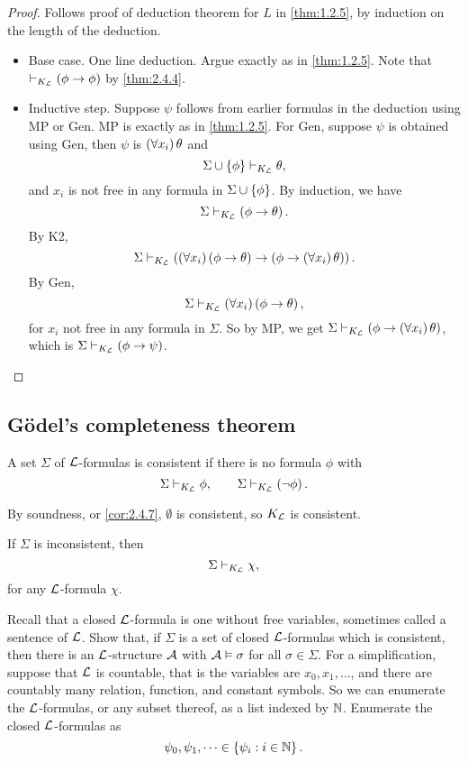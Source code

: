 \begin{proof}
Follows proof of deduction theorem for $ L $ in \ref{thm:1.2.5}, by induction on the length of the deduction.
\begin{itemize}
\item Base case. One line deduction. Argue exactly as in \ref{thm:1.2.5}. Note that $ \vdash_{K_\LL} \impb{\phi}{\phi} $ by \ref{thm:2.4.4}.
\item Inductive step. Suppose $ \psi $ follows from earlier formulas in the deduction using MP or Gen. MP is exactly as in \ref{thm:1.2.5}. For Gen, suppose $ \psi $ is obtained using Gen, then $ \psi $ is $ \fab{x_i}\theta $ and
$$ \Sigma \cup \cb{\phi} \vdash_{K_\LL} \theta, $$
and $ x_i $ is not free in any formula in $ \Sigma \cup \cb{\phi} $. By induction, we have
$$ \Sigma \vdash_{K_\LL} \impb{\phi}{\theta}. $$
By K2,
$$ \Sigma \vdash_{K_\LL} \impb{\fab{x_i}\impb{\phi}{\theta}}{\impb{\phi}{\fab{x_i}\theta}}. $$
By Gen,
$$ \Sigma \vdash_{K_\LL} \fab{x_i}\impb{\phi}{\theta}, $$
for $ x_i $ not free in any formula in $ \Sigma $. So by MP, we get $ \Sigma \vdash_{K_\LL} \impb{\phi}{\fab{x_i}\theta} $, which is $ \Sigma \vdash_{K_\LL} \impb{\phi}{\psi} $.
\end{itemize}
\end{proof}


\subsection{G\"odel's completeness theorem}

\begin{definition}
A set $ \Sigma $ of $ \LL $-formulas is consistent if there is no formula $ \phi $ with
$$ \Sigma \vdash_{K_\LL} \phi, \qquad \Sigma \vdash_{K_\LL} \notb{\phi}. $$
\end{definition}

By soundness, or \ref{cor:2.4.7}, $ \emptyset $ is consistent, so $ K_\LL $ is consistent.

\begin{remark*}
If $ \Sigma $ is inconsistent, then
$$ \Sigma \vdash_{K_\LL} \chi, $$
for any $ \LL $-formula $ \chi $.
\end{remark*}

Recall that a closed $ \LL $-formula is one without free variables, sometimes called a sentence of $ \LL $. Show that, if $ \Sigma $ is a set of closed $ \LL $-formulas which is consistent, then there is an $ \LL $-structure $ \AA $ with $ \AA \vDash \sigma $ for all $ \sigma \in \Sigma $. For a simplification, suppose that $ \LL $ is countable, that is the variables are $ x_0, x_1, \dots $, and there are countably many relation, function, and constant symbols. So we can enumerate the $ \LL $-formulas, or any subset thereof, as a list indexed by $ \N $. Enumerate the closed $ \LL $-formulas as
$$ \psi_0, \psi_1, \dots \in \cb{\psi_i : i \in \N}. $$

